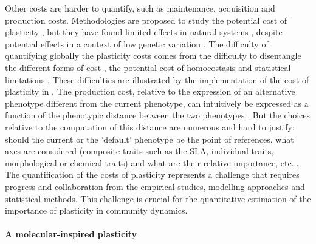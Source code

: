  Other costs are harder to quantify, such as maintenance, acquisition and production costs. Methodologies are proposed to study the potential cost of plasticity \parencite{dewitt_costs_1998, valladares_quantitative_2006}, but they have found limited effects in natural systems \parencite{van_kleunen_constraints_2005}, despite potential effects in a context of low genetic variation \parencite{dechaine_constraints_2007}. The difficulty of quantifying globally the plasticity costs comes from the difficulty to disentangle the different forms of cost \parencite{murren_constraints_2015}, the potential cost of homoeostasis \parencite{van_kleunen_progress_2007}  and statistical limitations \parencite{auld_measuring_2011}. These difficulties are illustrated by the implementation of the cost of plasticity in \model. The production cost, relative to the expression of an alternative phenotype different from the current phenotype, can intuitively be expressed as a function of the phenotypic distance between the two phenotypes \parencite{valladares_quantitative_2006}. But the choices relative to the computation of this distance are numerous and hard to justify: should the current or the 'default' phenotype be the point of references, what axes are considered (composite traits such as the  SLA, individual traits, morphological or chemical traits) and what are their relative importance, etc...
The quantification of the costs of plasticity represents a challenge that requires progress and collaboration from the empirical studies, modelling approaches and statistical methods. This challenge is crucial for the quantitative estimation of the importance of plasticity in community dynamics.
%
%
%
%
%

\paragraph{A molecular-inspired plasticity}

